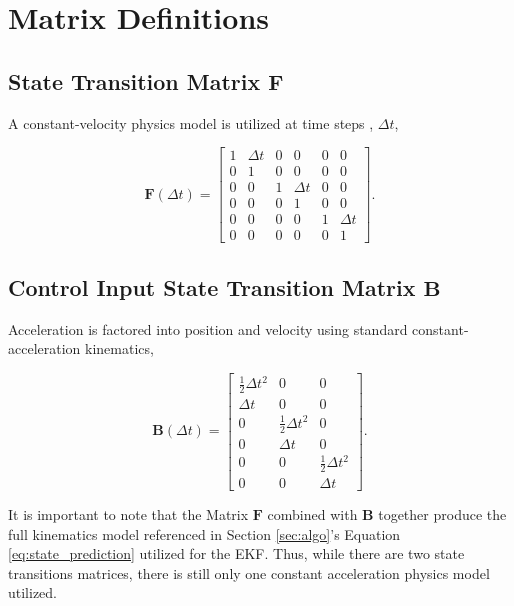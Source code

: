 \documentclass{article}
\begin{document}
\section{Matrix Definitions}
\label{sec:matrix_defn}
\subsection{State Transition Matrix $\mathbf{F}$}

A constant-velocity physics model is utilized at time steps , $\Delta t$, 

\begin{equation}
    \mathbf{F}(\Delta t) =
\begin{bmatrix}
1 & \Delta t & 0 & 0 & 0 & 0 \\
0 & 1 & 0 & 0 & 0 & 0 \\
0 & 0 & 1 & \Delta t & 0 & 0 \\
0 & 0 & 0 & 1 & 0 & 0 \\
0 & 0 & 0 & 0 & 1 & \Delta t \\
0 & 0 & 0 & 0 & 0 & 1
\end{bmatrix}.
\end{equation}



\subsection{Control Input State Transition Matrix $\mathbf{B}$}

Acceleration is factored into position and velocity using standard constant-acceleration kinematics, 

\[
\mathbf{B}(\Delta t) =
\begin{bmatrix}
\tfrac12 \Delta t^2 & 0 & 0 \\
\Delta t & 0 & 0 \\
0 & \tfrac12 \Delta t^2 & 0 \\
0 & \Delta t & 0 \\
0 & 0 & \tfrac12 \Delta t^2 \\
0 & 0 & \Delta t
\end{bmatrix}.
\]

It is important to note that the Matrix $\mathbf{F}$ combined with $\mathbf{B}$ together produce the full kinematics model referenced in Section \ref{sec:algo}'s Equation \ref{eq:state_prediction} utilized for the EKF. Thus, while there are two state transitions matrices, there is still only one constant acceleration physics model utilized. 
\end{document}
